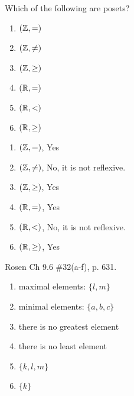 \begin{questions}
    \ifprintanswers
        \vspace{-10pt}
    \fi
{} Which of the following are posets? 
\ifprintanswers
        \vspace{-15pt}
\else
\begin{enumerate}[label=(\alph*),itemsep=0pt,parsep=0pt,
topsep=0pt,partopsep=0pt]
	\item $(\mathbb{Z}, =)$
	\item $(\mathbb{Z}, \neq)$
	\item $(\mathbb{Z}, \geq)$
	\item $(\mathbb{R}, =)$
	\item $(\mathbb{R}, <)$
	\item $(\mathbb{R}, \geq)$
\end{enumerate}
\fi
    \begin{solution}
    \begin{enumerate}[label=(\alph*),itemsep=0pt,parsep=0pt,
		topsep=0pt,partopsep=0pt]
		\item $(\mathbb{Z}, =)$, Yes
		\item $(\mathbb{Z}, \neq)$, No, it is not reflexive. 
		\item $(\mathbb{Z}, \geq)$, Yes
		\item $(\mathbb{R}, =)$, Yes
		\item $(\mathbb{R}, <)$, No, it is not reflexive.
		\item $(\mathbb{R}, \geq)$, Yes
	\end{enumerate}
    \end{solution}



    \ifprintanswers
        \vspace{-10pt}
    \fi
{} Rosen Ch 9.6 \#32(a-f), p. 631.
    \ifprintanswers
        \vspace{-15pt}
    \fi
    \begin{solution}
    \begin{enumerate}[label=(\alph*),itemsep=0pt,parsep=0pt,topsep=0pt,partopsep=0pt]
        \item maximal elements: $\{ l, m\}$
        \item minimal elements: $\{ a, b, c \}$
        \item there is no greatest element
        \item there is no least element
        \item $\{ k, l, m\}$
        \item $\{ k \}$
    \end{enumerate}
    \end{solution}



\end{questions}
